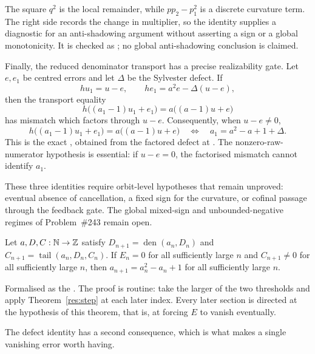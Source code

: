 \documentclass[11pt]{article}
\newcommand{\den}{\operatorname{den}}
\newcommand{\tail}{\operatorname{tail}}
\begin{document}
The square $q^2$ is the local remainder, while $pp_2-p_1^2$ is a discrete
curvature term.  The right side records the change in multiplier, so the
identity supplies a diagnostic for an anti-shadowing argument without
asserting a sign or a global monotonicity.  It is checked as
; no global anti-shadowing conclusion is
claimed.

Finally, the reduced denominator transport has a precise realizability gate.
Let $e,e_1$ be centred errors and let $\Delta$ be the Sylvester defect.  If
\[
 hu_1=u-e,
 \qquad he_1=a^2e-\Delta(u-e),
\]
then the transport equality
\[
 h\bigl((a_1-1)u_1+e_1\bigr)
   =a\bigl((a-1)u+e\bigr)
\]
has mismatch which factors through $u-e$.  Consequently, when $u-e\ne0$,
\[
 h\bigl((a_1-1)u_1+e_1\bigr)
   =a\bigl((a-1)u+e\bigr)
 \quad\Longleftrightarrow\quad
 a_1=a^2-a+1+\Delta.
\]
This is the exact
, obtained from the factored defect at
.  The nonzero-raw-numerator hypothesis is essential: if
$u-e=0$, the factorised mismatch cannot identify $a_1$.

These three identities require orbit-level hypotheses that remain unproved:
eventual absence of cancellation, a fixed sign for the curvature, or cofinal
passage through the feedback gate.  The global mixed-sign and
unbounded-negative regimes of Problem~\#243 remain open.

\begin{theorem}\label{res:eventual}
Let $a,D,C:\mathbb{N}\to\mathbb{Z}$ satisfy $D_{n+1}=\den(a_n,D_n)$ and
$C_{n+1}=\tail(a_n,D_n,C_n)$.  If $E_n=0$ for all sufficiently large $n$ and
$C_{n+1}\ne0$ for all sufficiently large $n$, then $a_{n+1}=a_n^{2}-a_n+1$ for
all sufficiently large $n$.
\end{theorem}

\noindent Formalised as the
.  The proof is routine: take the larger of the two
thresholds and apply Theorem~\ref{res:step} at each later index.  Every later
section is directed at the hypothesis of this theorem, that is, at forcing $E$
to vanish eventually.

The defect identity has a second consequence, which is what makes a single
vanishing error worth having.
\end{document}
